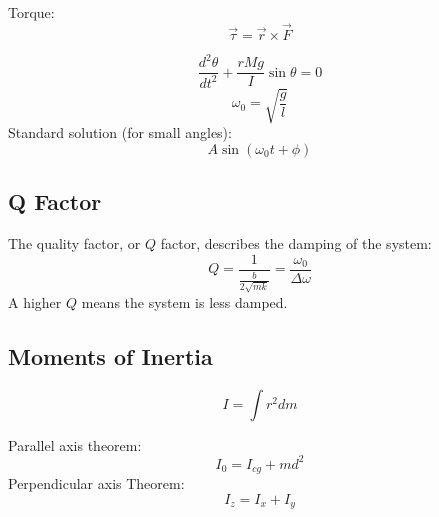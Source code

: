 \documentclass[12pt,a4paper]{article}
\begin{document}
	Torque:
	\[ \vec{\tau} = \vec{r} \times \vec{F}\]
	
	\[
	 \frac{d^2 \theta}{dt^2} + \frac{rMg}{I} \sin\theta = 0
	\]
	\[ \omega_0 = \sqrt{\frac{g}{l}}\]
	Standard solution (for small angles): \[ A \sin(\omega_0 t + \phi)\] 
	
	
	
	\subsection*{Q Factor}
	The quality factor, or \( Q \) factor, describes the damping of the system:
	\[
	Q = \frac{1}{\frac{b}{2\sqrt{mk}}} = \dfrac{\omega_0}{\Delta \omega}
	\]
	A higher \( Q \) means the system is less damped.
	
	
	

	
\subsection*{Moments of Inertia}
\[ I = \int r^2 dm\]

Parallel axis theorem:
\begin{equation}
	I_0 = I_{cg} + m d^2
\end{equation}
Perpendicular axis Theorem: 
\begin{equation}
	I_{z}=I_{x}+I_{y}
\end{equation}
\end{document}
